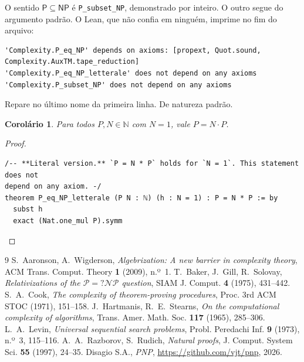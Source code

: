 \documentclass[11pt,a4paper]{amsart}
\newtheorem{corollario}[teorema]{Corolário}
\theoremstyle{remark}
\begin{document}
O sentido $\mathsf{P} \subseteq \mathsf{NP}$ é \texttt{P\_subset\_NP},
demonstrado por inteiro. O outro segue do argumento padrão. O Lean, que não
confia em ninguém, imprime no fim do arquivo:

\begin{listato}[\scriptsize]
\begin{verbatim}
'Complexity.P_eq_NP' depends on axioms: [propext, Quot.sound, Complexity.AuxTM.tape_reduction]
'Complexity.P_eq_NP_letterale' does not depend on any axioms
'Complexity.P_subset_NP' does not depend on any axioms
\end{verbatim}
\end{listato}

\noindent Repare no último nome da primeira linha. De natureza padrão.

\begin{corollario}\label{cor:lett}
Para todos $P, N \in \mathbb{N}$ com $N = 1$, vale $P = N \cdot P$.
\end{corollario}

\begin{proof}
\begin{listato}
\begin{verbatim}
/-- **Literal version.** `P = N * P` holds for `N = 1`. This statement does not
depend on any axiom. -/
theorem P_eq_NP_letterale (P N : ℕ) (h : N = 1) : P = N * P := by
  subst h
  exact (Nat.one_mul P).symm
\end{verbatim}
\end{listato}
\end{proof}

\begin{thebibliography}{9}
 S.~Aaronson, A.~Wigderson,
  \emph{Algebrization: A new barrier in complexity theory},
  ACM Trans. Comput. Theory \textbf{1} (2009), n.º~1.
 T.~Baker, J.~Gill, R.~Solovay,
  \emph{Relativizations of the $\mathcal{P} =? \mathcal{NP}$ question},
  SIAM J. Comput. \textbf{4} (1975), 431--442.
 S.~A.~Cook,
  \emph{The complexity of theorem-proving procedures},
  Proc. 3rd ACM STOC (1971), 151--158.
 J.~Hartmanis, R.~E.~Stearns,
  \emph{On the computational complexity of algorithms},
  Trans. Amer. Math. Soc. \textbf{117} (1965), 285--306.
 L.~A.~Levin,
  \emph{Universal sequential search problems},
  Probl. Peredachi Inf. \textbf{9} (1973), n.º~3, 115--116.
 A.~A.~Razborov, S.~Rudich,
  \emph{Natural proofs},
  J. Comput. System Sci. \textbf{55} (1997), 24--35.
 Disagio S.A.,
  \emph{PNP}, \url{https://github.com/vjt/pnp}, 2026.
\end{thebibliography}
\end{document}
